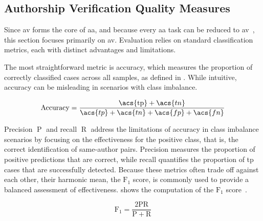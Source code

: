 \subsection{Authorship Verification Quality Measures}
\label{subsec:av_quality_measures}

Since \ac{av} forms the core of \ac{aa}, and because every \ac{aa} task can be reduced to \ac{av}~\citep{tyo_state_2022,barlas_cross_domain_2020}, this section focuses primarily on \ac{av}. 
Evaluation relies on standard classification metrics, each with distinct advantages and limitations.

The most straightforward metric is accuracy, which measures the proportion of correctly classified cases across all samples, as defined in . 
While intuitive, accuracy can be misleading in scenarios with class imbalance. 

\begin{equation}\label{eq:accuracy}
    \text{Accuracy} = \frac{\text{\acs{tp}} + \acs{tn}}{\acs{tp} + \acs{tn} + \acs{fp} + \acs{fn}}
\end{equation}

Precision $\operatorname{P}$ and recall $\operatorname{R}$ address the limitations of accuracy in class imbalance scenarios by focusing on the effectiveness for the positive class, that is, the correct identification of same-author pairs. 
Precision measures the proportion of positive predictions that are correct, while recall quantifies the proportion of \ac{tp} cases that are successfully detected. 
Because these metrics often trade off against each other, their harmonic mean, the $\operatorname{F_{1}}$ score, is commonly used to provide a balanced assessment of effectiveness. 
 shows the computation of the $\operatorname{F_{1}}$ score~\citep{neal_surveying_2018}.

\begin{equation}\label{eq:f1}
     \operatorname{F_{1}} = \frac{2\mathrm{P}  \mathrm{R}}{\mathrm{P} + \mathrm{R}}
\end{equation}

